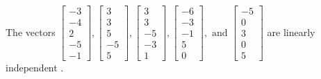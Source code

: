 \begin{exercise}
\begin{exerciseStatement}
  \end{exerciseStatement}
  \begin{exerciseAnswer}
   The vectors \(\left[\begin{array}{r}
-3 \\
-4 \\
2 \\
-5 \\
-1
\end{array}\right] , \left[\begin{array}{r}
3 \\
3 \\
5 \\
-5 \\
5
\end{array}\right] , \left[\begin{array}{r}
3 \\
3 \\
-5 \\
-3 \\
1
\end{array}\right] , \left[\begin{array}{r}
-6 \\
-3 \\
-1 \\
5 \\
0
\end{array}\right] , \text{ and } \left[\begin{array}{r}
-5 \\
0 \\
3 \\
0 \\
5
\end{array}\right]\) are 
  	 linearly independent  .
  


  \end{exerciseAnswer}
\end{exercise}